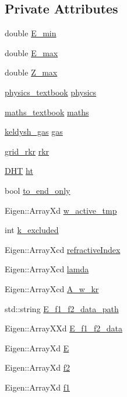 \subsection*{Private Attributes}
\begin{DoxyCompactItemize}
\item 
double \mbox{\hyperlink{classpropagation_ab5a753d760a135806a93b9082e8019fb}{E\+\_\+min}}
\item 
double \mbox{\hyperlink{classpropagation_a5d2b4202c82db47a1276c0ef1f7ad8c8}{E\+\_\+max}}
\item 
double \mbox{\hyperlink{classpropagation_ae0b2d1a8fa0e59d37e124a0ba1f12dd2}{Z\+\_\+max}}
\item 
\mbox{\hyperlink{classphysics__textbook}{physics\+\_\+textbook}} \mbox{\hyperlink{classpropagation_a42a6e725e3dd53cf94192bf93c31c8de}{physics}}
\item 
\mbox{\hyperlink{classmaths__textbook}{maths\+\_\+textbook}} \mbox{\hyperlink{classpropagation_ab5a5024c2d06c0dad06c745af7c6416c}{maths}}
\item 
\mbox{\hyperlink{classkeldysh__gas}{keldysh\+\_\+gas}} \mbox{\hyperlink{classpropagation_a4152dc9a226a7ff91aff2338d0bd813f}{gas}}
\item 
\mbox{\hyperlink{classgrid__rkr}{grid\+\_\+rkr}} \mbox{\hyperlink{classpropagation_a3d37531bb5918f972544d242aec7e72b}{rkr}}
\item 
\mbox{\hyperlink{class_d_h_t}{D\+HT}} \mbox{\hyperlink{classpropagation_a044544975e7fc2ec3df9a55d92f8cc90}{ht}}
\item 
bool \mbox{\hyperlink{classpropagation_a939b7a85171b3e5ce06560a3885ef0ca}{to\+\_\+end\+\_\+only}}
\item 
Eigen\+::\+Array\+Xd \mbox{\hyperlink{classpropagation_a07a80b67a345e3e9d8e934d2265ba288}{w\+\_\+active\+\_\+tmp}}
\item 
int \mbox{\hyperlink{classpropagation_a76f3651eac23a69c1259dc0406fbe0d9}{k\+\_\+excluded}}
\item 
Eigen\+::\+Array\+Xcd \mbox{\hyperlink{classpropagation_aba601a0df3c63b13215c55d8ade2bcd7}{refractive\+Index}}
\item 
Eigen\+::\+Array\+Xcd \mbox{\hyperlink{classpropagation_a5ae0154dc8db04188ba92e10ba981000}{lamda}}
\item 
Eigen\+::\+Array\+Xcd \mbox{\hyperlink{classpropagation_a4df23dd19a8cca8a4cb032718dc2b258}{A\+\_\+w\+\_\+kr}}
\item 
std\+::string \mbox{\hyperlink{classpropagation_abd78bf6976f2b2d0a3fc82b9cf0d9dc6}{E\+\_\+f1\+\_\+f2\+\_\+data\+\_\+path}}
\item 
Eigen\+::\+Array\+X\+Xd \mbox{\hyperlink{classpropagation_a53ab4838e0e66b55c2ab1398389a22f5}{E\+\_\+f1\+\_\+f2\+\_\+data}}
\item 
Eigen\+::\+Array\+Xd \mbox{\hyperlink{classpropagation_aff3713e9170542e31c952a2d1b760eec}{E}}
\item 
Eigen\+::\+Array\+Xd \mbox{\hyperlink{classpropagation_a747dcaf8f7405a17af992bae39b7fab5}{f2}}
\item 
Eigen\+::\+Array\+Xd \mbox{\hyperlink{classpropagation_a14d6e72396c1c354c6d9986f2d79f85f}{f1}}
\end{DoxyCompactItemize}


